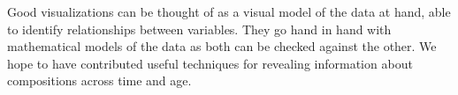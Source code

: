 \documentclass[a4paper, 12pt]{scrartcl}
\begin{document}
Good visualizations can be thought of as a visual model of the data at hand, able to identify relationships between variables. They go hand in hand with mathematical models of the data as both can be checked against the other. We hope to have contributed useful techniques for revealing information about compositions across time and age.

\clearpage


\sloppy
\printbibliography

\clearpage


\renewcommand\thefigure{\thesection.\arabic{figure}}
\setcounter{figure}{0}
\end{document}
